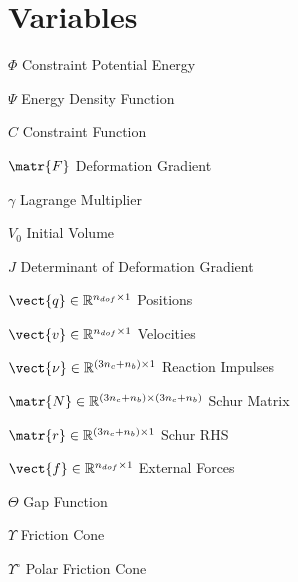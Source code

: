 \section*{Variables}
\begin{multicols}{2}
\begin{compactdesc}
    \item[$\Phi$] Constraint Potential Energy
    \item[$\Psi$] Energy Density Function
    \item[$C$] Constraint Function
    \item[$\matr{F}$] Deformation Gradient
    \item[$\gamma$] Lagrange Multiplier
    \item[$V_0$] Initial Volume
    \item[$J$] Determinant of Deformation Gradient
    
    \item[$\vect{q} \in \mathbb{R}^{n_{dof} \times 1}$] Positions
    \item[$\vect{v} \in \mathbb{R}^{n_{dof} \times 1}$] Velocities
    \item[$\vect{\nu}\in \mathbb{R}^{(3n_{c} +n_b) \times 1}$] Reaction Impulses
    \item[$\matr{N}\in \mathbb{R}^{(3n_{c} +n_b) \times (3n_{c} +n_b)}$] Schur Matrix
    \item[$\matr{r}\in \mathbb{R}^{(3n_{c} +n_b) \times 1}$] Schur RHS
    \item[$\vect{f}\in \mathbb{R}^{n_{dof} \times 1}$] External Forces
    \item[$\Theta$] Gap Function
    \item[$\Upsilon$] Friction Cone
    \item[$\Upsilon^{\circ}$] Polar Friction Cone
\end{compactdesc}
\end{multicols}

